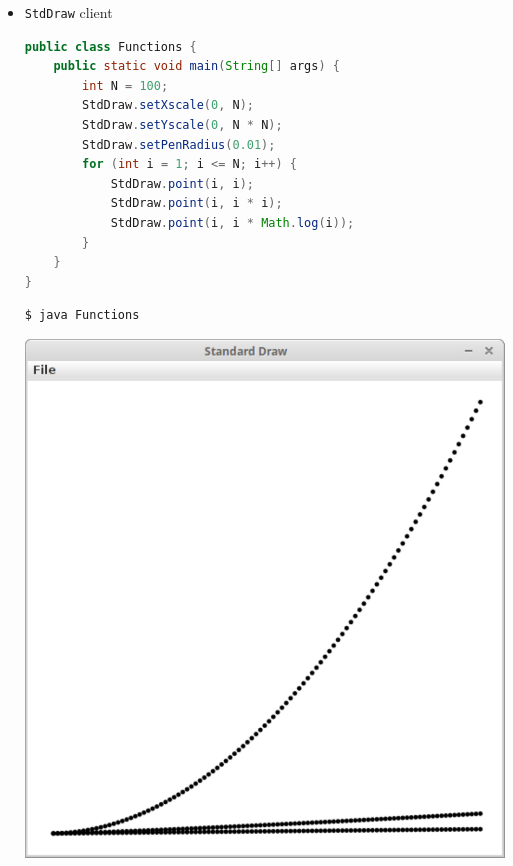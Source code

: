 \documentclass[8pt,a4paper,compress]{beamer}
\begin{document}
\begin{frame}[fragile]
\begin{itemize}
\item \lstinline{StdDraw} client
\begin{lstlisting}[language=Java]
public class Functions {
    public static void main(String[] args) {
        int N = 100;
        StdDraw.setXscale(0, N);
        StdDraw.setYscale(0, N * N);
        StdDraw.setPenRadius(0.01);
        for (int i = 1; i <= N; i++) {
            StdDraw.point(i, i);
            StdDraw.point(i, i * i);
            StdDraw.point(i, i * Math.log(i));
        }
    }	
}
\end{lstlisting}

\begin{minipage}{140pt}
\begin{lstlisting}[language={}]
$ java Functions
\end{lstlisting}
\end{minipage}%
\begin{minipage}{140pt}
\hfill \includegraphics[scale=0.25]{./figures/functions.pdf}
\end{minipage}
\end{itemize}
\end{frame}
\end{document}
